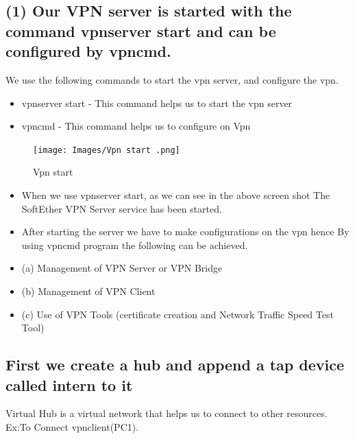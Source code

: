 \subsection{(1) Our VPN server is started with the command vpnserver start and can be configured by vpncmd.}
We use the following commands to start the vpn server, and configure the vpn.
\begin{itemize}
\item vpnserver start - This command helps us to start the vpn server 
\item vpncmd - This command helps us to configure on Vpn 
\end{itemize}
\begin{figure}[H]
\centering
  \texttt{[image: Images/Vpn start .png]}
  \caption{Vpn start}
  \label{fig }
\end{figure}
\begin{itemize}
\item When we use vpnserver start, as we can see in the above screen shot The SoftEther VPN Server service has been started.
\item After starting the server we have to make configurations on the vpn hence By using vpncmd program  the following can be achieved.
\item(a) Management of VPN Server or VPN Bridge 
\item (b) Management of VPN Client
\item (c) Use of VPN Tools (certificate creation and Network Traffic Speed Test Tool)
\end{itemize}

\subsection{ First we create a hub and append a tap device called intern to it}
Virtual Hub is a virtual network that helps us to connect to other resources.
Ex:To Connect vpnclient(PC1).

